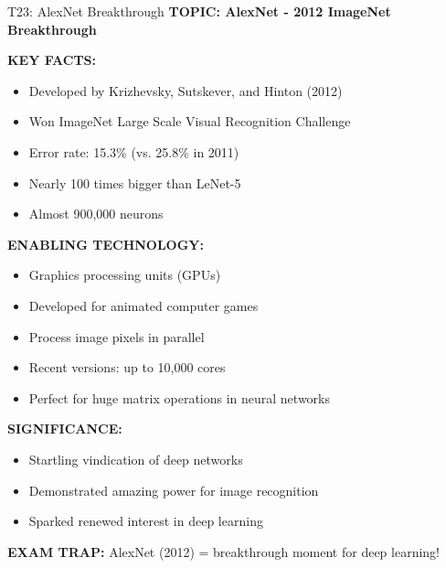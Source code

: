 \documentclass[8pt]{beamer}
\begin{document}
	\begin{frame}{T23: AlexNet Breakthrough}
		\fontsize{6.5}{7.5}\selectfont
		\textbf{TOPIC: AlexNet - 2012 ImageNet Breakthrough}
		
		\vspace{0.1cm}
		\textbf{KEY FACTS:}
		\begin{itemize}
			\item Developed by Krizhevsky, Sutskever, and Hinton (2012)
			\item Won ImageNet Large Scale Visual Recognition Challenge
			\item Error rate: 15.3\% (vs. 25.8\% in 2011)
			\item Nearly 100 times bigger than LeNet-5
			\item Almost 900,000 neurons
		\end{itemize}
		
		\vspace{0.1cm}
		\textbf{ENABLING TECHNOLOGY:}
		\begin{itemize}
			\item Graphics processing units (GPUs)
			\item Developed for animated computer games
			\item Process image pixels in parallel
			\item Recent versions: up to 10,000 cores
			\item Perfect for huge matrix operations in neural networks
		\end{itemize}
		
		\vspace{0.1cm}
		\textbf{SIGNIFICANCE:}
		\begin{itemize}
			\item Startling vindication of deep networks
			\item Demonstrated amazing power for image recognition
			\item Sparked renewed interest in deep learning
		\end{itemize}
		
		\textcolor{myred}{\textbf{EXAM TRAP:}} AlexNet (2012) = \textcolor{myblue}{breakthrough moment} for deep learning!
	\end{frame}
	
\end{document}
